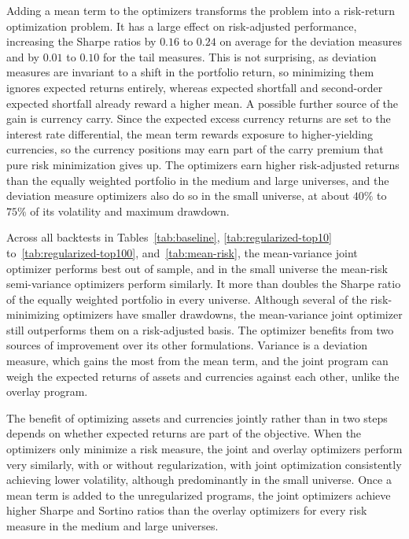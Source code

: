 Adding a mean term to the optimizers transforms the problem into a risk-return optimization problem. 
It has a large effect on risk-adjusted performance, increasing the Sharpe ratios by $0.16$ to $0.24$ on average for the deviation
measures and by $0.01$ to $0.10$ for the tail measures. This is not surprising, as deviation measures are
invariant to a shift in the portfolio return, so minimizing them ignores expected returns entirely, whereas expected
shortfall and second-order expected shortfall already reward a higher mean. 
A possible further source of the gain is currency carry. Since the expected excess currency returns are set to the
interest rate differential, the mean term rewards exposure to higher-yielding currencies, so the currency positions may
earn part of the carry premium that pure risk minimization gives up. The optimizers earn higher risk-adjusted returns than the equally weighted portfolio in the medium and large
universes, and the deviation measure optimizers also do so in the small universe, at about $40\%$ to $75\%$ of its volatility and
maximum drawdown.

Across all backtests in Tables~\ref{tab:baseline}, \ref{tab:regularized-top10} to~\ref{tab:regularized-top100},
and~\ref{tab:mean-risk}, the mean-variance joint optimizer performs best out of sample, and in the small universe the
mean-risk semi-variance optimizers perform similarly. It more than doubles the Sharpe ratio of the equally
weighted portfolio in every universe. Although several of the risk-minimizing optimizers
have smaller drawdowns, the mean-variance joint optimizer still outperforms them on a risk-adjusted basis. The optimizer
benefits from two sources of improvement over its other formulations. Variance is a deviation measure, which gains the most from the mean term, and the
joint program can weigh the expected returns of assets and currencies against each other, unlike the overlay program.

The benefit of optimizing assets and currencies jointly rather than in two steps
depends on whether expected returns are part of the objective. When the optimizers only
minimize a risk measure, the joint and overlay optimizers perform very similarly, with or
without regularization, with joint optimization consistently achieving lower volatility,
 although predominantly in the small universe.
Once a mean term is added to the unregularized programs, the joint optimizers achieve higher Sharpe and Sortino ratios
than the overlay optimizers for every risk measure in the medium and large universes.

